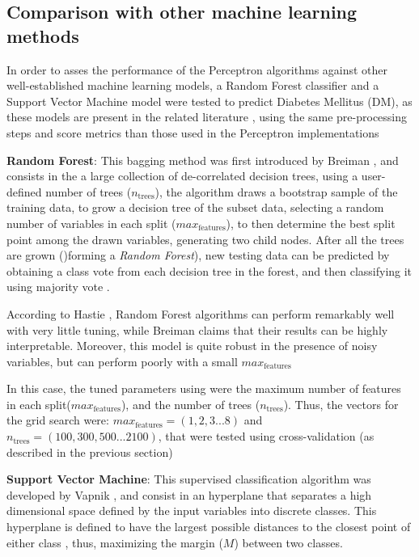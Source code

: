 \documentclass[10pt,twocolumn,letterpaper]{article}
\begin{document}
\subsection{Comparison with other machine learning methods}

In order to asses the performance of the Perceptron algorithms against other well-established machine learning models, a Random Forest classifier and a Support Vector Machine model were tested to predict Diabetes Mellitus (DM), as these models are present in the related literature \cite{Xu2017,Santhanam2015}, using the same pre-processing steps and score metrics than those used in the Perceptron implementations

\textbf{Random Forest}: This bagging method was first introduced by Breiman \cite{Breiman2001b}, and consists in the a large collection of de-correlated decision trees, using a user-defined number of trees ($n_\mathrm{trees}$), the algorithm draws a bootstrap sample of the training data, to grow a decision tree of the subset data, selecting a random number of variables in each split ($max_\mathrm{features}$), to then determine the best split point among the drawn variables, generating two child nodes. After all the trees are grown ()forming a \emph{Random Forest}), new testing data can be predicted by obtaining a class vote from each decision tree in the forest, and then classifying it using majority vote \cite{Hastie2009}.

According to Hastie \cite{Hastie2009}, Random Forest algorithms can perform remarkably well with very little tuning, while Breiman \cite{Breiman2001b} claims that their results can be highly interpretable. Moreover, this model is quite robust in the presence of noisy variables, but can perform poorly with a small $max_\mathrm{features}$ \cite{Breiman2001b}

In this case, the tuned parameters using were the maximum number of features in each split($max_\mathrm{features}$), and the number of trees ($n_\mathrm{trees}$). Thus, the vectors for the grid search were: $max_\mathrm{features} = (1,2,3...8)$ and $n_\mathrm{trees} = (100,300,500...2100)$, that were tested using cross-validation (as described in the previous section)

\textbf{Support Vector Machine}: This supervised classification algorithm was developed by Vapnik \cite{Vapnik1995}, and consist in an hyperplane that separates a high dimensional space defined by the input variables into discrete classes. This hyperplane is defined to have the largest possible distances to the closest point of either class \cite{Hastie2009}, thus, maximizing the margin ($M$) between two classes. 
\end{document}
